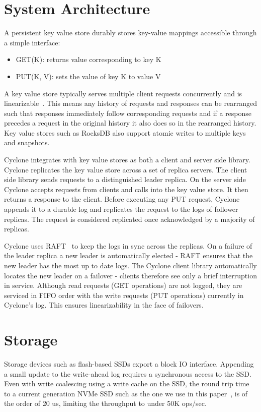 \documentclass[pageno]{jpaper}
\begin{document}
\section{System Architecture}
\label{sec:sysarch}
A persistent key value store durably stores key-value mappings accessible through a
simple interface:

\begin{itemize}
\item GET(K): returns value corresponding to key K
\item PUT(K, V): sets the value of key K to value V
\end{itemize}

A key value store typically serves multiple client requests concurrently and is
linearizable~\cite{linearizability}. This means any history of requests and
responses can be rearranged such that responses immediately follow corresponding
requests and if a response precedes a request in the original history it also
does so in the rearranged history. Key value stores such as RocksDB also
support atomic writes to multiple keys and snapshots. 

Cyclone integrates with key value stores as both a client and server side
library. Cyclone replicates the key value store across a set of replica
servers. The client side library sends requests to a distinguished leader
replica.  On the server side Cyclone accepts requests from clients and calls
into the key value store. It then returns a response to the client. Before
executing any PUT request, Cyclone appends it to a durable log and replicates
the request to the logs of follower replicas. The request is considered
replicated once acknowledged by a majority of replicas.

Cyclone uses RAFT~\cite{raft} to keep the logs in sync across the replicas. On a
failure of the leader replica a new leader is automatically elected - RAFT
ensures that the new leader has the most up to date logs. The Cyclone client
library automatically locates the new leader on a failover - clients therefore
see only a brief interruption in service. Although read requests (GET
operations) are not logged, they are serviced in FIFO order with the write requests
(PUT operations) currently in Cyclone's log. This ensures linearizability in the
face of failovers.

\section{Storage}
\label{sec:storage}
Storage devices such as flash-based SSDs export a block IO interface. Appending
a small update to the write-ahead log requires a synchronous access to the SSD. Even with 
write coalescing using a write cache on the SSD, the round  trip time to a current generation NVMe 
SSD such as the one we use in this paper~\cite{ssd_spec}, is of the order of 20 us, limiting the throughput to under 50K ops/sec. 
\end{document}
